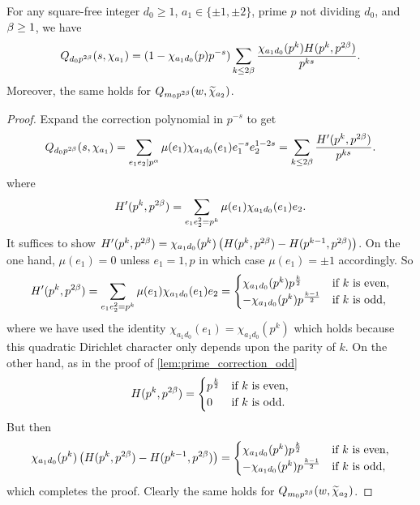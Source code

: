 \documentclass[12pt,reqno,oneside]{amsart}
\begin{document}
    \begin{lemma}\label{lem:prime_correction_even}
        For any square-free integer $d_{0} \ge 1$, $a_{1} \in \{\pm1,\pm2\}$, prime $p$ not dividing $d_{0}$, and $\beta \ge 1$, we have
        \[
            Q_{d_{0}p^{2\beta}}(s,\chi_{a_{1}}) = (1-\chi_{a_{1}d_{0}}(p)p^{-s})\sum_{k \le 2\beta}\frac{\chi_{a_{1}d_{0}}(p^{k})H(p^{k},p^{2\beta})}{p^{ks}}.
        \]
        Moreover, the same holds for $Q_{m_{0}p^{2\beta}}(w,\widetilde{\chi}_{a_{2}})$.
    \end{lemma}
    \begin{proof}
        Expand the correction polynomial in $p^{-s}$ to get
        \[
            Q_{d_{0}p^{2\beta}}(s,\chi_{a_{1}}) = \sum_{e_{1}e_{2} \mid p^{\alpha}}\mu(e_{1})\chi_{a_{1}d_{0}}(e_{1})e_{1}^{-s}e_{2}^{1-2s} = \sum_{k \le 2\beta}\frac{H'(p^{k},p^{2\beta})}{p^{ks}}.
        \]
        where
        \[
            H'(p^{k},p^{2\beta}) = \sum_{e_{1}e_{2}^{2} = p^{k}}\mu(e_{1})\chi_{a_{1}d_{0}}(e_{1})e_{2}.
        \]
        It suffices to show $H'(p^{k},p^{2\beta}) = \chi_{a_{1}d_{0}}(p^{k})\left(H(p^{k},p^{2\beta})-H(p^{k-1},p^{2\beta})\right)$. On the one hand, $\mu(e_{1}) = 0$ unless $e_{1} = 1,p$ in which case $\mu(e_{1}) = \pm1$ accordingly. So
        \[
            H'(p^{k},p^{2\beta}) = \sum_{e_{1}e_{2}^{2} = p^{k}}\mu(e_{1})\chi_{a_{1}d_{0}}(e_{1})e_{2} = \begin{cases} \chi_{a_{1}d_{0}}(p^{k})p^{\frac{k}{2}} & \text{if $k$ is even}, \\ -\chi_{a_{1}d_{0}}(p^{k})p^{\frac{k-1}{2}} & \text{if $k$ is odd}, \end{cases}
        \]
        where we have used the identity $\chi_{a_{1}d_{0}}(e_{1}) = \chi_{a_{1}d_{0}}(p^{k})$ which holds because this quadratic Dirichlet character only depends upon the parity of $k$. On the other hand, as in the proof of \cref{lem:prime_correction_odd} 
        \[
            H(p^{k},p^{2\beta}) = \begin{cases} p^{\frac{k}{2}} & \text{if $k$ is even}, \\ 0 & \text{if $k$ is odd}. \end{cases}
        \]
        But then
        \[
            \chi_{a_{1}d_{0}}(p^{k})\left(H(p^{k},p^{2\beta})-H(p^{k-1},p^{2\beta})\right) = \begin{cases} \chi_{a_{1}d_{0}}(p^{k})p^{\frac{k}{2}} & \text{if $k$ is even}, \\ -\chi_{a_{1}d_{0}}(p^{k})p^{\frac{k-1}{2}} & \text{if $k$ is odd}, \end{cases}
        \]
        which completes the proof. Clearly the same holds for $Q_{m_{0}p^{2\beta}}(w,\widetilde{\chi}_{a_{2}})$.
    \end{proof}
\end{document}
